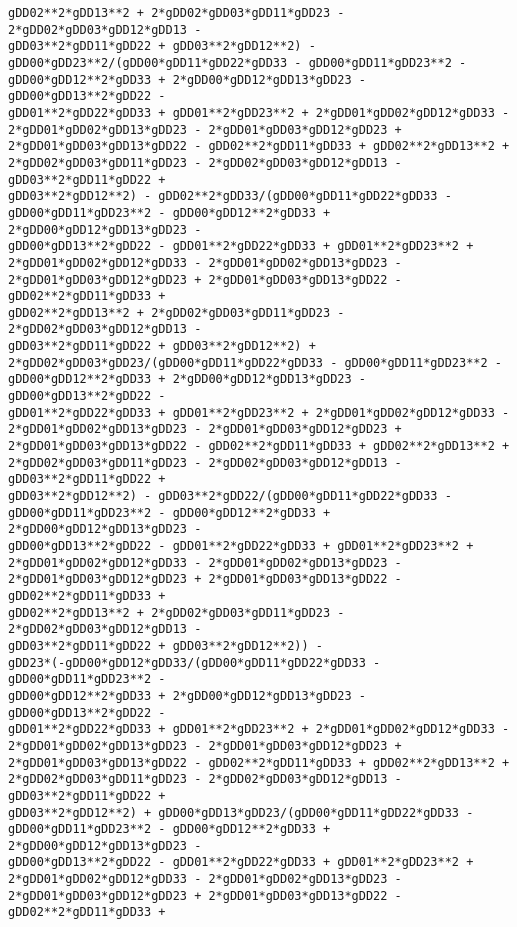\documentclass[landscape,letterpaper,10pt,english]{article}
\begin{document}
\begin{Verbatim}[commandchars=\\\{\}]
gDD02**2*gDD13**2 + 2*gDD02*gDD03*gDD11*gDD23 - 2*gDD02*gDD03*gDD12*gDD13 -
gDD03**2*gDD11*gDD22 + gDD03**2*gDD12**2) -
gDD00*gDD23**2/(gDD00*gDD11*gDD22*gDD33 - gDD00*gDD11*gDD23**2 -
gDD00*gDD12**2*gDD33 + 2*gDD00*gDD12*gDD13*gDD23 - gDD00*gDD13**2*gDD22 -
gDD01**2*gDD22*gDD33 + gDD01**2*gDD23**2 + 2*gDD01*gDD02*gDD12*gDD33 -
2*gDD01*gDD02*gDD13*gDD23 - 2*gDD01*gDD03*gDD12*gDD23 +
2*gDD01*gDD03*gDD13*gDD22 - gDD02**2*gDD11*gDD33 + gDD02**2*gDD13**2 +
2*gDD02*gDD03*gDD11*gDD23 - 2*gDD02*gDD03*gDD12*gDD13 - gDD03**2*gDD11*gDD22 +
gDD03**2*gDD12**2) - gDD02**2*gDD33/(gDD00*gDD11*gDD22*gDD33 -
gDD00*gDD11*gDD23**2 - gDD00*gDD12**2*gDD33 + 2*gDD00*gDD12*gDD13*gDD23 -
gDD00*gDD13**2*gDD22 - gDD01**2*gDD22*gDD33 + gDD01**2*gDD23**2 +
2*gDD01*gDD02*gDD12*gDD33 - 2*gDD01*gDD02*gDD13*gDD23 -
2*gDD01*gDD03*gDD12*gDD23 + 2*gDD01*gDD03*gDD13*gDD22 - gDD02**2*gDD11*gDD33 +
gDD02**2*gDD13**2 + 2*gDD02*gDD03*gDD11*gDD23 - 2*gDD02*gDD03*gDD12*gDD13 -
gDD03**2*gDD11*gDD22 + gDD03**2*gDD12**2) +
2*gDD02*gDD03*gDD23/(gDD00*gDD11*gDD22*gDD33 - gDD00*gDD11*gDD23**2 -
gDD00*gDD12**2*gDD33 + 2*gDD00*gDD12*gDD13*gDD23 - gDD00*gDD13**2*gDD22 -
gDD01**2*gDD22*gDD33 + gDD01**2*gDD23**2 + 2*gDD01*gDD02*gDD12*gDD33 -
2*gDD01*gDD02*gDD13*gDD23 - 2*gDD01*gDD03*gDD12*gDD23 +
2*gDD01*gDD03*gDD13*gDD22 - gDD02**2*gDD11*gDD33 + gDD02**2*gDD13**2 +
2*gDD02*gDD03*gDD11*gDD23 - 2*gDD02*gDD03*gDD12*gDD13 - gDD03**2*gDD11*gDD22 +
gDD03**2*gDD12**2) - gDD03**2*gDD22/(gDD00*gDD11*gDD22*gDD33 -
gDD00*gDD11*gDD23**2 - gDD00*gDD12**2*gDD33 + 2*gDD00*gDD12*gDD13*gDD23 -
gDD00*gDD13**2*gDD22 - gDD01**2*gDD22*gDD33 + gDD01**2*gDD23**2 +
2*gDD01*gDD02*gDD12*gDD33 - 2*gDD01*gDD02*gDD13*gDD23 -
2*gDD01*gDD03*gDD12*gDD23 + 2*gDD01*gDD03*gDD13*gDD22 - gDD02**2*gDD11*gDD33 +
gDD02**2*gDD13**2 + 2*gDD02*gDD03*gDD11*gDD23 - 2*gDD02*gDD03*gDD12*gDD13 -
gDD03**2*gDD11*gDD22 + gDD03**2*gDD12**2)) -
gDD23*(-gDD00*gDD12*gDD33/(gDD00*gDD11*gDD22*gDD33 - gDD00*gDD11*gDD23**2 -
gDD00*gDD12**2*gDD33 + 2*gDD00*gDD12*gDD13*gDD23 - gDD00*gDD13**2*gDD22 -
gDD01**2*gDD22*gDD33 + gDD01**2*gDD23**2 + 2*gDD01*gDD02*gDD12*gDD33 -
2*gDD01*gDD02*gDD13*gDD23 - 2*gDD01*gDD03*gDD12*gDD23 +
2*gDD01*gDD03*gDD13*gDD22 - gDD02**2*gDD11*gDD33 + gDD02**2*gDD13**2 +
2*gDD02*gDD03*gDD11*gDD23 - 2*gDD02*gDD03*gDD12*gDD13 - gDD03**2*gDD11*gDD22 +
gDD03**2*gDD12**2) + gDD00*gDD13*gDD23/(gDD00*gDD11*gDD22*gDD33 -
gDD00*gDD11*gDD23**2 - gDD00*gDD12**2*gDD33 + 2*gDD00*gDD12*gDD13*gDD23 -
gDD00*gDD13**2*gDD22 - gDD01**2*gDD22*gDD33 + gDD01**2*gDD23**2 +
2*gDD01*gDD02*gDD12*gDD33 - 2*gDD01*gDD02*gDD13*gDD23 -
2*gDD01*gDD03*gDD12*gDD23 + 2*gDD01*gDD03*gDD13*gDD22 - gDD02**2*gDD11*gDD33 +

\end{Verbatim}
\end{document}
